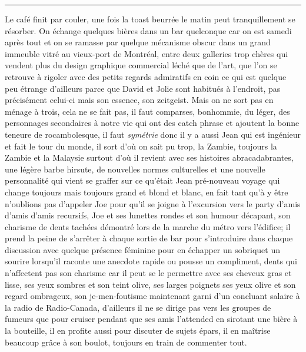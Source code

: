 \begin{center}\noindent\rule{0.5\textwidth}{0.4pt}\end{center}
Le café finit par couler, une fois la toast beurrée le matin peut
tranquillement  se résorber. On échange quelques bières dans un bar quelconque
car on est samedi après tout et on se ramasse par quelque mécanisme obscur dans
un grand immeuble vitré au vieux-port de Montréal, entre deux galleries trop
chères qui vendent plus du design graphique commercial léché que de l'art, que
l'on se retrouve à rigoler avec des petits regards admiratifs en coin ce qui
est quelque peu étrange d'ailleurs parce que David et Jolie sont habitués à
l'endroit, pas précisément celui-ci mais son essence, son zeitgeist. Mais on ne
sort pas en ménage à trois, cela ne se fait pas, il faut comparses, bonhommie,
du léger, des personnages secondaires
à notre vie qui ont des catch phrase et ajoutent la bonne teneure de 
rocambolesque, il faut \emph{symétrie} donc il y a aussi Jean qui est ingénieur et
fait le tour du monde, il sort d'où on sait pu trop, la Zambie, toujours la
Zambie et la Malaysie surtout d'où il revient avec ses histoires
abracadabrantes, une légère barbe hirsute, de nouvelles normes culturelles et
une nouvelle personnalité qui vient se graffer sur ce qu'était Jean pré-nouveau
voyage qui change toujours mais toujours grand et blond et blanc, en fait tant
qu'à y être n'oublions pas d'appeler Joe pour qu'il se joigne à l'excursion vers
le party d'amis d'amis d'amis recursifs, Joe et  ses lunettes rondes et son humour
décapant, son charisme de dents tachées démontré lors de la marche du métro
vers l'édifice; il prend la peine de s'arrêter à chaque sortie de bar
pour s'introduire dans chaque discussion avec quelque présence féminine pour
en échapper un sobriquet un sourire lorsqu'il raconte une anecdote rapide
ou pousse un compliment, dents qui n'affectent pas son charisme
car il peut se le permettre avec ses cheveux gras et lisse, ses yeux sombres et
son teint olive, ses larges poignets ses yeux olive et son regard ombrageux,
son je-men-foutisme maintenant garni d'un concluant salaire à la radio de
Radio-Canada, d'ailleurs il ne se dirige pas vers les groupes de fumeurs
que pour cruiser pendant que ses amis l'attended en sirotant une bière à
la bouteille, il en profite aussi pour discuter de sujets épars, il en maîtrise
beaucoup grâce à son boulot, toujours en train de commenter tout.\\

